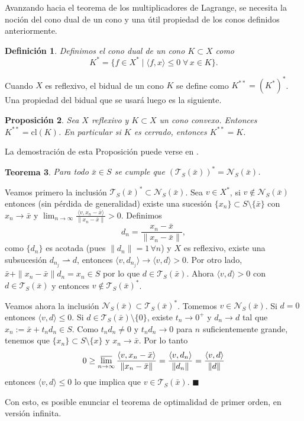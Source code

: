 \documentclass[a4paper,10pt]{book}
\newcommand{\bx}{\bar{x}}
\newcommand{\cN}{\mathcal{N}}
\newcommand{\cT}{\mathcal{T}}
\newcommand{\la}{\langle}
\newcommand{\ra}{\rangle}
\newcommand{\deb}{\rightharpoonup}
\newtheorem{teo}{Teorema}%
\newtheorem{prop}[teo]{Proposici\'on}
\newtheorem{defi}[teo]{Definici\'on}
\newenvironment{dem}{\vspace*{-0.1cm}{\it Demostraci\'on:}}{\hfill
$\blacksquare$\\}
\begin{document}
Avanzando hacia el teorema de los multiplicadores de Lagrange, se necesita la noción del cono dual de un cono y una útil propiedad de los conos definidos anteriormente.

\begin{defi}
 Definimos el cono dual de un cono  $K\subset X$ como
$$K^*=\{f\in X^*\mid\langle f,x\rangle\leq 0\;\forall\,x\in K\}.$$
\end{defi}

Cuando $X$ es reflexivo, el bidual de un cono $K$ se define como $K^{**}=(K^*)^*$. Una propiedad del bidual que se usará luego es la siguiente.
\begin{prop}\label{conobidual}
 Sea $X$ reflexivo y $K\subset X$ un cono convexo. Entonces $K^{**}=\mathrm{cl}(K)$. En particular si $K$ es cerrado, entonces $K^{**}=K$.
\end{prop}
La demostración de esta Proposición puede verse en \cite[Proposition 2.40]{bonnans2013perturbation}.

\begin{teo}
Para todo $\bx\in S$ se cumple que $(\cT_{S}(\bx))^*=\cN_{S}(\bx)$.
\end{teo} 
\begin{dem}
Veamos primero la inclusión $\cT_S(\bx)^*\subset \cN_S(\bx)$. Sea $v\in X^*$, si $v\notin\cN_S(\bx)$ entonces (sin pérdida de generalidad) existe una sucesión $\{x_n\}\subset S\setminus\{\bx\}$ con $x_n\to \bx$ y $\lim_{n\to\infty}\frac{\la v, x_n-\bx\ra}{\|x_n-\bx\|}>0$. Definimos $$d_n=\frac{x_n-\bx}{\|x_n-\bx\|},$$ como $\{d_n\}$ es acotada (pues $\|d_n\|=1\,\forall n$) y $X$ es reflexivo, existe una subsucesión $d_{n_j}\deb d$, entonces $\la v , d_{n_j}\ra\to\la v , d\ra>0$. Por otro lado, $\bx+\|x_n-\bx\|d_n=x_n\in S$ por lo que $d\in \cT_S(\bx)$. Ahora $\la v , d\ra>0$ con $d\in\cT_S(\bx)$ y entonces $v\notin\cT_S(\bx)^*$.

Veamos ahora la inclusión $\cN_S(\bx)\subset\cT_S(\bx)^*$. Tomemos $v\in\cN_S(\bx)$. Si $d=0$ entonces $\la v,d\ra\leq0$. Si $d\in\cT_S(\bx)\setminus\{0\}$, existe $t_n\to 0^+$ y $d_n\to d$ tal que $x_n:=\bx+t_nd_n\in S$. Como $t_nd_n\neq0$ y $t_nd_n\to 0$ para $n$ suficientemente grande, tenemos que $\{x_n\}\subset S\setminus\{x\}$ y $x_n\to\bx$. Por lo tanto $$0\geq\varlimsup_{n\to\infty}\frac{\la v,x_n-\bx\ra}{\|x_n-\bx\|}=\frac{\la v,d_n\ra}{\|d_n\|}=\frac{\la v,d\ra}{\|d\|}$$ entonces $\la v,d\ra\leq0$ lo que implica que $v\in \cT_S(\bx)$.
\end{dem}

Con esto, es posible enunciar el teorema de optimalidad de primer orden, en versión infinita.
\end{document}
